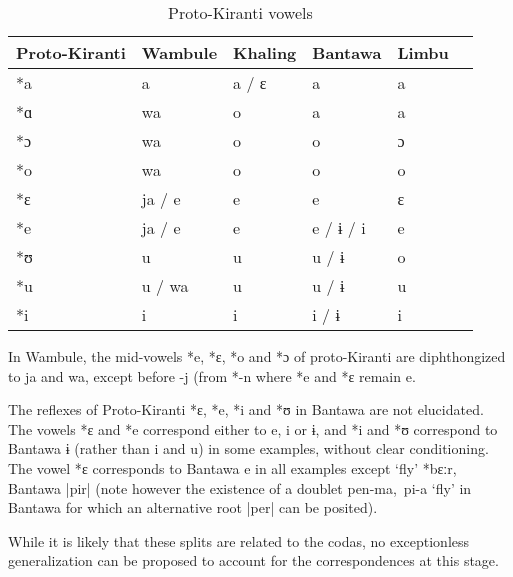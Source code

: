 \documentclass[oneside,a4paper,11pt]{article}
\newcommand{\ipa}[1]{{\phon\mbox{#1}}} %
\begin{document}
\begin{table}[H]
\caption{Proto-Kiranti vowels} \centering \label{tab:vowels}
\begin{tabular}{llllll}
\toprule
Proto-Kiranti & Wambule & Khaling & Bantawa & Limbu \\
\midrule
\ipa{*a} & \ipa{a} & \ipa{a}  / \ipa{ɛ} & \ipa{a} & \ipa{a}  \\
\ipa{*ɑ} & \ipa{wa} & \ipa{o} & \ipa{a} & \ipa{a}  \\
\ipa{*ɔ} & \ipa{wa} & \ipa{o} & \ipa{o} & \ipa{ɔ}  \\
\ipa{*o} & \ipa{wa} & \ipa{o} & \ipa{o} & \ipa{o}  \\
\ipa{*ɛ} & \ipa{ja} /  \ipa{e} & \ipa{e} & \ipa{e}  & \ipa{ɛ}  \\
\ipa{*e} & \ipa{ja} /  \ipa{e}  & \ipa{e} & \ipa{e}  / \ipa{ɨ} / \ipa{i} & \ipa{e}    \\
\ipa{*ʊ} & \ipa{u} & \ipa{u} & \ipa{u}  /  \ipa{ɨ}  & \ipa{o} \\
\ipa{*u} & \ipa{u} / \ipa{wa} & \ipa{u} & \ipa{u} /  \ipa{ɨ} \  & \ipa{u} \\
\ipa{*i} & \ipa{i} & \ipa{i} & \ipa{i}  / \ipa{ɨ} & \ipa{i}  \\
\bottomrule
\end{tabular}
\end{table}

In Wambule, the mid-vowels \ipa{*e}, \ipa{*ɛ}, \ipa{*o} and \ipa{*ɔ} of proto-Kiranti are diphthongized to \ipa{ja} and \ipa{wa}, except before \ipa{-j} (from *\ipa{-n} where \ipa{*e} and \ipa{*ɛ} remain \ipa{e}. 

The reflexes of Proto-Kiranti *\ipa{ɛ}, *\ipa{e}, *\ipa{i} and *\ipa{ʊ} in Bantawa are not elucidated. The vowels *\ipa{ɛ} and *\ipa{e} correspond either to \ipa{e}, \ipa{i} or \ipa{ɨ}, and *\ipa{i} and *\ipa{ʊ} correspond to Bantawa \ipa{ɨ} (rather than \ipa{i} and \ipa{u}) in some examples, without clear conditioning. The vowel *\ipa{ɛ} corresponds to Bantawa \ipa{e} in all examples except `fly' *\ipa{bɛːr}, Bantawa \ipa{|pir|} (note however the existence of a doublet \ipa{pen-ma, pi-a} `fly' in Bantawa for which an alternative root \ipa{|per|} can be posited).

While it is likely that these splits are related to the codas, no exceptionless generalization can be proposed to account for the correspondences at this stage.
 
\end{document}
